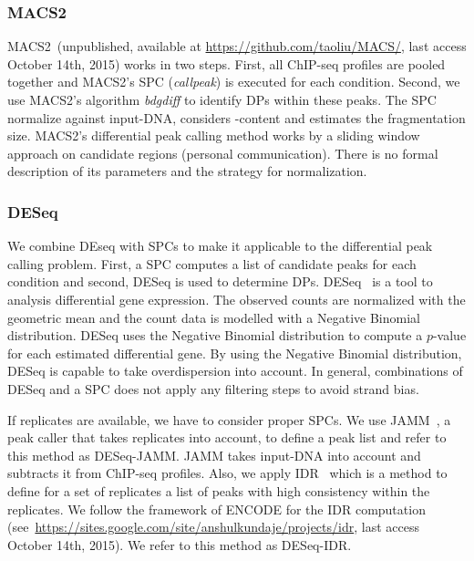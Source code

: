 \subsubsection{MACS2}
MACS2~(unpublished, available at \url{https://github.com/taoliu/MACS/}, last access October 14th, 2015) works in two steps.
First, all ChIP-seq profiles are pooled together and MACS2's SPC (\textit{callpeak}) is executed for each condition.
Second, we use MACS2's algorithm \textit{bdgdiff} to identify DPs within these peaks.
The SPC normalize against input-DNA, considers -content and estimates the fragmentation size.
MACS2's differential peak calling method works by a sliding window approach on candidate regions (personal communication). 
There is no formal description of its parameters and the strategy for normalization. 

\subsubsection{DESeq}
We combine DEseq with SPCs to make it applicable to the differential peak calling problem.
First, a SPC computes a list of candidate peaks for each condition and second, DESeq is used to determine DPs.
DESeq~\citep{anders2010} is a tool to analysis differential gene expression.
The observed counts are normalized with the geometric mean and the count data is modelled with a Negative Binomial distribution.
DESeq uses the Negative Binomial distribution to compute a $p$-value for each estimated differential gene.
By using the Negative Binomial distribution, DESeq is capable to take overdispersion into account.
In general, combinations of DESeq and a SPC does not apply any filtering steps to avoid strand bias.

If replicates are available, we have to consider proper SPCs.
We use JAMM~\citep{Ibrahim2015}, a peak caller that takes replicates into account, to define a peak list and refer to this method as DESeq-JAMM. 
JAMM takes input-DNA into account and subtracts it from ChIP-seq profiles.
Also, we apply IDR~\citep{Li2011} which is a method to define for a set of replicates a list of peaks with high consistency within the replicates.
We follow the framework of ENCODE for the IDR computation (see~\url{https://sites.google.com/site/anshulkundaje/projects/idr}, last access October 14th, 2015).
We refer to this method as DESeq-IDR.


